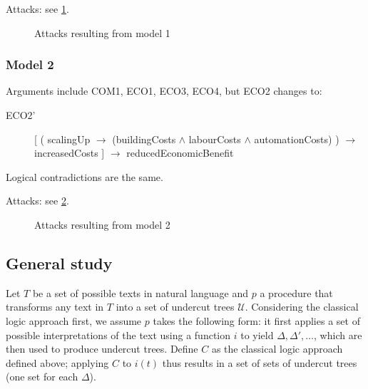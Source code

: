\documentclass[version=3.21, pagesize, twoside=off, bibliography=totoc, DIV=calc, fontsize=12pt, a4paper, french, english]{scrartcl}
\begin{document}
Attacks: see \cref{fig:m1}.
\begin{figure}
	\caption{Attacks resulting from model 1}
	\label{fig:m1}
\end{figure}

\subsubsection{Model 2}
Arguments include COM1, ECO1, ECO3, ECO4, but ECO2 changes to:
\begin{description}
	\item[ECO2’] [ ( scalingUp $→$ (buildingCosts $\land$ labourCosts $\land$ automationCosts) ) $→$ increasedCosts ] $→$ reducedEconomicBenefit
\end{description}

Logical contradictions are the same.

Attacks: see \cref{fig:m2}.
\begin{figure}
	\caption{Attacks resulting from model 2}
	\label{fig:m2}
\end{figure}

\subsection{General study}
Let $T$ be a set of possible texts in natural language and $p$ a procedure that transforms any text in $T$ into a set of undercut trees $\mathcal{U}$. Considering the classical logic approach first, we assume $p$ takes the following form: it first applies a set of possible interpretations of the text using a function $i$ to yield $\Delta, \Delta', …$, which are then used to produce undercut trees. Define $C$ as the classical logic approach defined above; applying $C$ to $i(t)$ thus results in a set of sets of undercut trees (one set for each $\Delta$).
\end{document}
